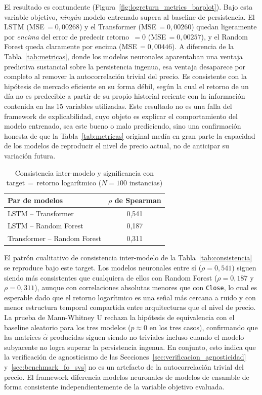 \documentclass[conference, letterpaper]{IEEEtran}
\begin{document}
El resultado es contundente (Figura~\ref{fig:logreturn_metrics_barplot}). Bajo esta variable objetivo, \emph{ningún}
modelo entrenado supera al baseline de persistencia. El LSTM
(MSE\,$=0{,}00268$) y el Transformer (MSE\,$=0{,}00260$) quedan
ligeramente por \emph{encima} del error de predecir retorno~$=0$
(MSE\,$=0{,}00257$), y el Random Forest queda claramente por encima
(MSE\,$=0{,}00446$). A diferencia de la Tabla~\ref{tab:metricas}, donde
los modelos neuronales aparentaban una ventaja predictiva sustancial
sobre la persistencia ingenua, esa ventaja desaparece por completo al
remover la autocorrelación trivial del precio. Es consistente con la
hipótesis de mercado eficiente en su forma débil, según la cual el
retorno de un día no es predecible a partir de su propio historial
reciente con la información contenida en las 15 variables utilizadas.
Este resultado no es una falla del framework de explicabilidad, cuyo
objeto es explicar el comportamiento del modelo entrenado, sea este
bueno o malo prediciendo, sino una confirmación honesta de que la
Tabla~\ref{tab:metricas} original medía en gran parte la capacidad de
los modelos de reproducir el nivel de precio actual, no de anticipar
su variación futura.

\begin{table}[h]
\centering
\caption{Consistencia inter-modelo y significancia con
target\,$=$\,retorno logarítmico ($N{=}100$ instancias)}
\label{tab:logreturn_consistency}
\begin{tabular}{lc}
\toprule
\textbf{Par de modelos} & \textbf{$\rho$ de Spearman} \\
\midrule
LSTM -- Transformer          & 0{,}541 \\
LSTM -- Random Forest        & 0{,}187 \\
Transformer -- Random Forest & 0{,}311 \\
\bottomrule
\end{tabular}
\end{table}

El patrón cualitativo de consistencia inter-modelo de la
Tabla~\ref{tab:consistencia} se reproduce bajo este target. Los
modelos neuronales entre sí ($\rho{=}0{,}541$) siguen siendo más
consistentes que cualquiera de ellos con Random Forest
($\rho{=}0{,}187$ y $\rho{=}0{,}311$), aunque con correlaciones
absolutas menores que con \texttt{Close}, lo cual es esperable dado que el
retorno logarítmico es una señal más cercana a ruido y con menor
estructura temporal compartida entre arquitecturas que el nivel de
precio. La prueba de Mann-Whitney U rechaza la hipótesis de
equivalencia con el baseline aleatorio para los tres modelos
($p\approx 0$ en los tres casos), confirmando que las matrices
$\hat{\alpha}$ producidas siguen siendo no triviales incluso cuando
el modelo subyacente no logra superar la persistencia ingenua. En
conjunto, esto indica que la verificación de agnosticismo de las
Secciones~\ref{sec:verificacion_agnosticidad}
y~\ref{sec:benchmark_fo_svs} no es un artefacto de la autocorrelación
trivial del precio. El framework diferencia modelos neuronales de
modelos de ensamble de forma consistente independientemente de la
variable objetivo evaluada.
\end{document}
